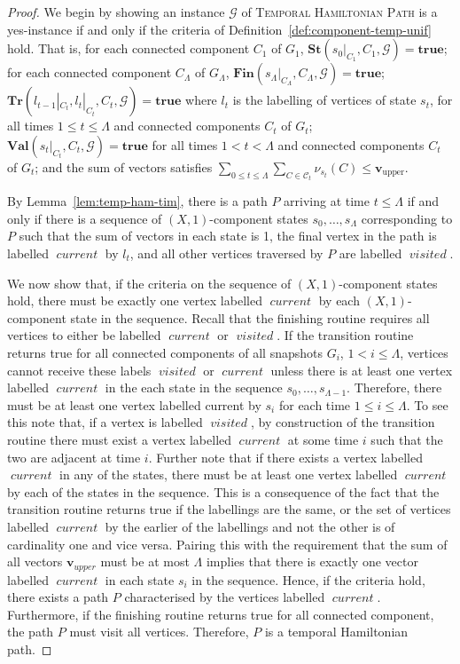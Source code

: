 \documentclass[a4paper,UKenglish,cleveref, autoref, thm-restate]{lipics-v2021} %
\DeclareMathOperator{\visited}{\textit{visited}}
\DeclareMathOperator{\current}{\textit{current}}
\begin{document}
\begin{toappendix}
\begin{proof}
    We begin by showing an instance $\mathcal{G}$ of \textsc{Temporal Hamiltonian Path} is a yes-instance if and only if the criteria of Definition~\ref{def:component-temp-unif} hold. That is, for each connected component $C_1$ of $G_1$, $\textbf{St}(s_0|_{C_1},C_1,\mathcal{G})=\textbf{true}$; for each connected component $C_{\Lambda}$ of $G_{\Lambda}$, $\textbf{Fin}(s_{\Lambda}|_{C_{\Lambda}},C_{\Lambda},\mathcal{G})=\textbf{true}$; $\textbf{Tr}(l_{t-1}|_{C_t}, l_t|_{C_t}, C_t,\mathcal{G})=\textbf{true}$ where $l_t$ is the labelling of vertices of state $s_t$, for all times $1 \leq t \leq \Lambda$ and connected components $C_t$ of $G_t$; $\textbf{Val}(s_t|_{C_t}, C_t,\mathcal{G})=\textbf{true}$ for all times $1 < t < \Lambda$ and connected components $C_t$ of $G_t$; and the sum of vectors satisfies $\sum_{0\leq t\leq \Lambda} \sum_{C \in\mathcal{C}_t}\nu_{s_t} (C)\leq \textbf{v}_{\text{upper}}$.

    By Lemma~\ref{lem:temp-ham-tim}, there is a path $P$ arriving at time $t\leq \Lambda$ if and only if there is a sequence of $(X,1)$-component states $s_0,\ldots,s_{\Lambda}$ corresponding to $P$ such that the sum of vectors in each state is 1, the final vertex in the path is labelled $\current$ by $l_t$, and all other vertices traversed by $P$ are labelled $\visited$. 
    
    We now show that, if the criteria on the sequence of $(X,1)$-component states hold, there must be exactly one vertex labelled $\current$ by each $(X,1)$-component state in the sequence. Recall that the finishing routine requires all vertices to either be labelled $\current$ or $\visited$. If the transition routine returns true for all connected components of all snapshots $G_i$, $1<i\leq \Lambda$, vertices cannot receive these labels $\visited$ or $\current$ unless there is at least one vertex labelled $\current$ in the each state in the sequence $s_0,\ldots,s_{\Lambda-1}$. Therefore, there must be at least one vertex labelled current by $s_i$ for each time $1\leq i\leq \Lambda$. To see this note that, if a vertex is labelled $\visited$, by construction of the transition routine there must exist a vertex labelled $\current$ at some time $i$ such that the two are adjacent at time $i$. Further note that if there exists a vertex labelled $\current$ in any of the states, there must be at least one vertex labelled $\current$ by each of the states in the sequence. This is a consequence of the fact that the transition routine returns true if the labellings are the same, or the set of vertices labelled $\current$ by the earlier of the labellings and not the other is of cardinality one and vice versa. Pairing this with the requirement that the sum of all vectors $\textbf{v}_{upper}$ must be at most $\Lambda$ implies that there is exactly one vector labelled $\current$ in each state $s_i$ in the sequence. Hence, if the criteria hold, there exists a path $P$ characterised by the vertices labelled $\current$. Furthermore, if the finishing routine returns true for all connected component, the path $P$ must visit all vertices. Therefore, $P$ is a temporal Hamiltonian path.  


\end{proof}
\end{toappendix}
\end{document}
